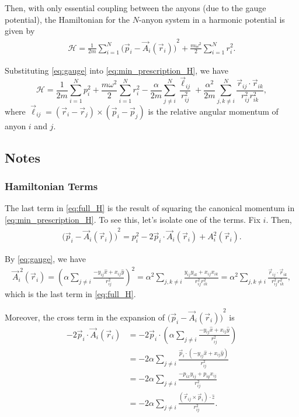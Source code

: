 Then, with only essential coupling between the anyons (due to the gauge potential), the Hamiltonian for the $N$-anyon system in a harmonic potential is given by
\begin{align}
    \mathcal{H} = \frac{1}{2m} \sum_{i=1}^{N}{\bigl(\vec{p}_i - \vec{A}_i(\vec{r}_i)\bigr)}^2 + \frac{m\omega^2}{2}\sum_{i=1}^{N}{r}_i^{2}. \label{eq:min_prescription_H}
\end{align}

Substituting \cref{eq:gauge} into \cref{eq:min_prescription_H}, we have
\begin{equation}
    \mathcal{H} = \frac{1}{2m}\sum_{i=1}^{N}{p}_i^{2} + \frac{m\omega^2}{2}\sum_{i=1}^{N}{r}_i^{2} - \frac{\alpha}{2m}\sum_{j\neq i}^{N}\frac{\vec{\ell}_{ij}}{r_{ij}^2} + \frac{\alpha^2}{2m}\sum_{j,k\neq i}^{N}\frac{\vec{r}_{ij}\cdot\vec{r}_{ik}}{r_{ij}^2r_{ik}^2},\label{eq:full_H}
\end{equation}
where $\vec{\ell}_{ij} = (\vec{r}_i-\vec{r}_j)\times(\vec{p}_i-\vec{p}_j)$ is the relative angular momentum of anyon $i$ and $j$.

\subsection{Notes}
\subsubsection{Hamiltonian Terms}
The last term in \cref{eq:full_H} is the result of squaring the canonical momentum in \cref{eq:min_prescription_H}. To see this, let's isolate one of the terms. Fix $i$. Then,
\begin{align*}
    {\bigl(\vec{p}_i - \vec{A}_i(\vec{r}_i)\bigr)}^2 = {p}_i^{2} - 2\vec{p}_i\cdot\vec{A}_i(\vec{r}_i) + {A}_i^{2}(\vec{r}_i).
\end{align*}

By \cref{eq:gauge}, we have
\begin{align*}
    \vec{A}_i^{\;2}(\vec{r}_i) = {\left( \alpha\sum_{j\neq i}\frac{-y_{ij}\hat{x} + x_{ij}\hat{y}}{r_{ij}^2} \right)}^2 = \alpha^2\sum_{j,k\neq i}\frac{y_{ij}y_{ik} + x_{ij}x_{ik}}{r_{ij}^2r_{ik}^2} = \alpha^2\sum_{j,k\neq i}\frac{\vec{r}_{ij}\cdot\vec{r}_{ik}}{r_{ij}^2r_{ik}^2},
\end{align*}
which is the last term in \cref{eq:full_H}.

Moreover, the cross term in the expansion of ${\bigl(\vec{p}_i - \vec{A}_i(\vec{r}_i)\bigr)}^2$ is
\begin{align*}
    -2\vec{p}_i\cdot\vec{A}_i(\vec{r}_i) &= -2\vec{p}_i\cdot\left( \alpha\sum_{j\neq i}\frac{-y_{ij}\hat{x} + x_{ij}\hat{y}}{r_{ij}^2} \right) \\
    &= -2\alpha\sum_{j\neq i}\frac{\vec{p}_i\cdot\left( -y_{ij}\hat{x} + x_{ij}\hat{y} \right)}{r_{ij}^2} \\
    &= -2\alpha\sum_{j\neq i}\frac{-p_{ix}y_{ij} + p_{iy}x_{ij}}{r_{ij}^2} \\
    &= -2\alpha\sum_{j\neq i}\frac{(\vec{r}_{ij}\times\vec{p}_i)\cdot\hat{z}}{r_{ij}^2}.
\end{align*}

